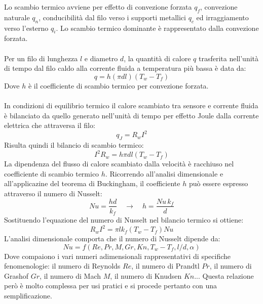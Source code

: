 Lo scambio termico avviene per effetto di convezione forzata $q_f$, convezione naturale $q_n$, conducibilità dal filo verso i supporti metallici $q_c$ ed irraggiamento verso l'esterno $q_i$. Lo scambio termico dominante è rappresentato dalla convezione forzata.\\\\
Per un filo di lunghezza $l$ e diametro $d$, la quantità di calore $q$ trasferita nell'unità di tempo dal filo caldo alla corrente fluida a temperatura più bassa è data da:
\begin{equation*}
    q = h(\pi d l) (T_w - T_f)
\end{equation*}
Dove $h$ è il coefficiente di scambio termico per convezione forzata.\\\\
In condizioni di equilibrio termico il calore scambiato tra sensore e corrente fluida è bilanciato da quello generato nell'unità di tempo per effetto Joule dalla corrente elettrica che attraversa il filo:
\begin{equation*}
    q_J = R_w I^2
\end{equation*}
Risulta quindi il bilancio di scambio termico:
\begin{equation*}
    I^2R_w = h\pi d l (T_w - T_f)
\end{equation*}
La dipendenza del flusso di calore scambiato dalla velocità è racchiuso nel coefficiente di scambio termico $h$. Ricorrendo all'analisi dimensionale e all'applicazine del teorema di Buckingham, il coefficiente $h$ può essere espresso attraverso il numero di Nusselt:
\begin{equation*}
    Nu = \frac{ h d}{k_f} \quad \rightarrow \quad h = \frac{Nu\, k_f}d
\end{equation*}
Sostituendo l'equazione del numero di Nusselt nel bilancio termico si ottiene:
\begin{equation*}
    R_w I^2 = \pi l k_f (T_w - T_f) Nu
\end{equation*}
L'analisi dimensionale comporta che il numero di Nusselt dipende da:
\begin{equation*}
    Nu = f(Re, Pr, M, Gr, Kn, T_w-T_f, l/d, \alpha)
\end{equation*}
Dove compaiono i vari numeri adimensionali rappresentativi di specifiche fenomenologie: il numero di Reynolds $Re$, il numero di Prandtl $Pr$, il numero di Grashof $Gr$, il numero di Mach $M$, il numero di Knudsen $Kn$... Questa relazione però è molto complessa per usi pratici e si procede pertanto con una semplificazione.\\\\

